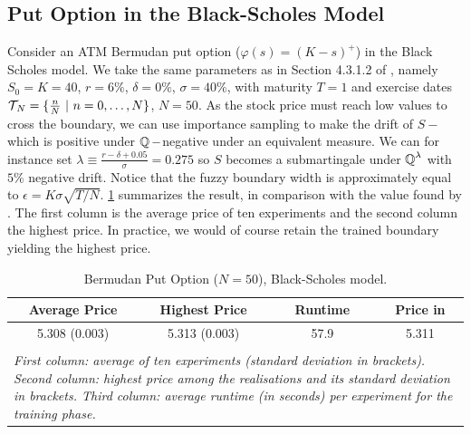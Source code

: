 \subsection{Put Option in the Black-Scholes Model} \label{sec:putBS}
Consider an ATM Bermudan put option ($\varphi(s) = (K-s)^+$) in the Black Scholes model. We take the same parameters as in  Section 4.3.1.2 of \cite{Becker2}, namely
$S_0=K=40$, $r = 6\%$, $\delta = 0\%$, $\sigma = 40\%$, with maturity $T=1$ and exercise dates $\operatorname{\mathcal{T}}_{\!N} = \{\frac{n}{N} \ | \ n=0,\ldots,N\}$, $N=50$.  
As the stock price must reach low values to cross the boundary, we can use importance sampling to make the drift of $S-$which is positive under $\operatorname{\mathbb{Q}}-$negative under an equivalent measure. We can for instance set $\lambda \equiv \frac{r-\delta + 0.05}{\sigma}  = 0.275$ so $S$ becomes a submartingale under $\operatorname{\mathbb{Q}}^{\lambda}$ with $5\%$ negative drift. Notice that the fuzzy boundary width is approximately equal to $\epsilon = K\sigma \sqrt{T/N}$.  \cref{tab:resultPutBS} summarizes the result, in comparison with the value found by \citet{Becker1}. The first column is the average price of ten experiments and the second column the highest price. In practice, we would of course retain the trained boundary yielding the highest price. 

\begin{table}[ht]
  \centering
  \caption{Bermudan Put Option ($N=50$), Black-Scholes model.  
 }
 
 \vspace{-2mm}
 
  \begin{tabular}{cccc}
 \hline \hline
    Average Price  & Highest Price & Runtime  & Price in \cite{Becker2}  \\
  \hline  \hline
  5.308 (0.003)  &  5.313 (0.003) &  57.9 & 5.311 \\
  \hline \\[-1em]
  
  \multicolumn{4}{l}{%
  \begin{minipage}{9.cm}%
    \tiny \textit{First  column:  average  of ten experiments (standard deviation in brackets). Second column: highest price  among the realisations and its standard deviation in brackets.  Third column:  average runtime (in seconds) per experiment for the training phase.}%
  \end{minipage}%
}

\end{tabular}
\vspace{2mm}
\label{tab:resultPutBS}
  \end{table}

